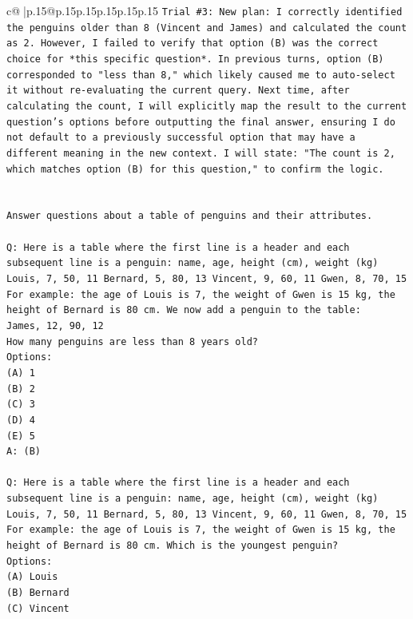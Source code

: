 \documentclass{article}
\begin{document}
{\begin{supertabular}{c@{$\;$}|p{.15\linewidth}@{}p{.15\linewidth}p{.15\linewidth}p{.15\linewidth}p{.15\linewidth}p{.15\linewidth}}
{{{\texttt{Trial \#3: New plan: I correctly identified the penguins older than 8 (Vincent and James) and calculated the count as 2. However, I failed to verify that option (B) was the correct choice for *this specific question*. In previous turns, option (B) corresponded to "less than 8," which likely caused me to auto{-}select it without re{-}evaluating the current query. Next time, after calculating the count, I will explicitly map the result to the current question's options before outputting the final answer, ensuring I do not default to a previously successful option that may have a different meaning in the new context. I will state: "The count is 2, which matches option (B) for this question," to confirm the logic.} \\
\\ 
\\ 
\texttt{Answer questions about a table of penguins and their attributes.} \\
\\ 
\texttt{Q: Here is a table where the first line is a header and each subsequent line is a penguin:  name, age, height (cm), weight (kg) Louis, 7, 50, 11 Bernard, 5, 80, 13 Vincent, 9, 60, 11 Gwen, 8, 70, 15  For example: the age of Louis is 7, the weight of Gwen is 15 kg, the height of Bernard is 80 cm.  We now add a penguin to the table:} \\
\texttt{James, 12, 90, 12} \\
\texttt{How many penguins are less than 8 years old?} \\
\texttt{Options:} \\
\texttt{(A) 1} \\
\texttt{(B) 2} \\
\texttt{(C) 3} \\
\texttt{(D) 4} \\
\texttt{(E) 5} \\
\texttt{A: (B)} \\
\\ 
\texttt{Q: Here is a table where the first line is a header and each subsequent line is a penguin:  name, age, height (cm), weight (kg) Louis, 7, 50, 11 Bernard, 5, 80, 13 Vincent, 9, 60, 11 Gwen, 8, 70, 15  For example: the age of Louis is 7, the weight of Gwen is 15 kg, the height of Bernard is 80 cm.  Which is the youngest penguin?} \\
\texttt{Options:} \\
\texttt{(A) Louis} \\
\texttt{(B) Bernard} \\
\texttt{(C) Vincent} \\
}}}
\end{supertabular}}
\end{document}
